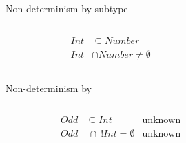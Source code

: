 \begin{frame}{Non-determinism by subtype}
  \begin{columns}[T]
    \begin{column}{0.4\textwidth}
      \centering
      
      \begin{align*}
        Int&\subseteq Number\\
        Int &\cap Number \neq \emptyset
      \end{align*}%
      \scalebox{0.8}{}%
    \end{column}%
    \begin{column}{0.6\textwidth}
      \only<2>{\scalebox{0.8}{}}%
    \end{column}
  \end{columns}
\end{frame}







\begin{frame}{Non-determinism by }
  \begin{columns}[T]
    \begin{column}{0.35\textwidth}
      \centering
      \begin{align*}
        Odd&\subseteq Int &\text{unknown}\\
        Odd&~\cap~ !Int = \emptyset &\text{unknown}
      \end{align*}
      \scalebox{1.0}{}%
    \end{column}%
    \begin{column}{0.7\textwidth}
    \end{column}
  \end{columns}
\end{frame}




